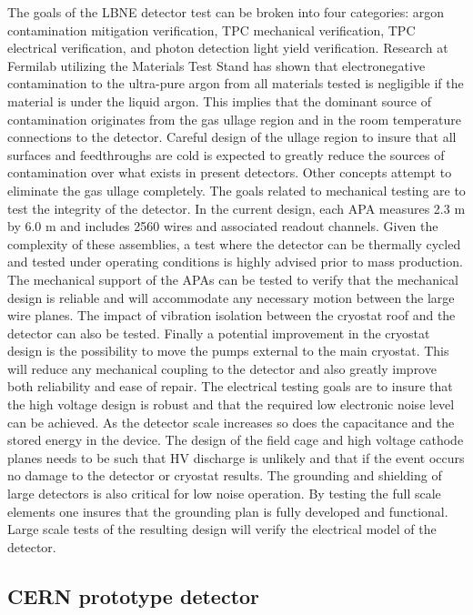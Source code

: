 The goals of the LBNE detector test can be broken into four categories: argon contamination mitigation verification, TPC mechanical verification, TPC electrical verification, and photon detection light yield verification. Research at Fermilab utilizing the Materials Test Stand has shown that electronegative contamination to the ultra-pure argon from all materials tested is negligible if the material is under the liquid argon. This implies that the dominant source of contamination originates from the gas ullage region and in the room temperature connections to the detector. Careful design of the ullage region to insure that all surfaces and feedthroughs are cold is expected to greatly reduce the sources of contamination over what exists in present detectors. Other concepts attempt to eliminate the gas ullage completely. The goals related to mechanical testing are to test the integrity of the detector. In the current design, each APA measures 2.3 m by 6.0 m and includes 2560 wires and associated readout channels. Given the complexity of these assemblies, a test where the detector can be thermally cycled and tested under operating conditions is highly advised prior to mass production. The mechanical support of the APAs can be tested to verify that the mechanical design is reliable and will accommodate any necessary motion between the large wire planes. The impact of vibration isolation between the cryostat roof and the detector can also be tested. Finally a potential improvement in the cryostat design is the possibility to move the pumps external to the main cryostat. This will reduce any mechanical coupling to the detector and also greatly improve both reliability and ease of repair. The electrical testing goals are to insure that the high voltage design is robust and that the required low electronic noise level can be achieved. As the detector scale increases so does the capacitance and the stored energy in the device. The design of the field cage and high voltage cathode planes needs to be such that HV discharge is unlikely and that if the event occurs no damage to the detector or cryostat results. The grounding and shielding of large detectors is also critical for low noise operation. By testing the full scale elements one insures that the grounding plan is fully developed and functional. Large scale tests of the resulting design will verify the electrical model of the detector. 


\subsection{CERN prototype detector}


